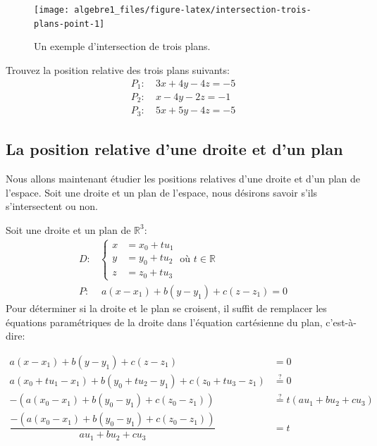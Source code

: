 \documentclass[]{book}
\theoremstyle{definition}
\theoremstyle{definition}
\theoremstyle{definition}
\theoremstyle{remark}
\let\BeginKnitrBlock\begin \let\EndKnitrBlock\end
\begin{document}
\begin{figure}

{\centering \texttt{[image: algebre1\_files/figure-latex/intersection-trois-plans-point-1]} 

}

\caption{Un exemple d'intersection de trois plans.}\label{fig:intersection-trois-plans-point}
\end{figure}

\BeginKnitrBlock{example}
\protect\hypertarget{exm:unnamed-chunk-228}{}{\label{exm:unnamed-chunk-228} }Trouvez la position relative des trois plans suivants:
\begin{align*}
P_1 :& \ 3x+4y-4z = -5 \\
P_2 :& \ x-4y-2z = -1 \\
P_3 :& \ 5x+5y-4z = -5
\end{align*}
\EndKnitrBlock{example}

\hypertarget{la-position-relative-dune-droite-et-dun-plan}{%
\subsection{La position relative d'une droite et d'un plan}\label{la-position-relative-dune-droite-et-dun-plan}}

Nous allons maintenant étudier les positions relatives d'une droite et d'un plan de l'espace. Soit une droite et un plan de l'espace, nous désirons savoir s'ils s'intersectent ou non.

Soit une droite et un plan de \(\mathbb{R}^3\):
\begin{align*}
D :& \begin{cases}
x &= x_0+tu_1 \\
y &= y_0+tu_2 \\
z &= z_0+tu_3
\end{cases} 
\ \text{où } t\in\mathbb{R} \\
P :& \ a(x-x_1)+b(y-y_1)+c(z-z_1)=0 
\end{align*}
Pour déterminer si la droite et le plan se croisent, il suffit de remplacer les équations paramétriques de la droite dans l'équation cartésienne du plan, c'est-à-dire:

\begin{align}
a(x-x_1)+b(y-y_1)+c(z-z_1) &= 0 \nonumber\\
a(x_0+tu_1-x_1)+b(y_0+tu_2-y_1)+c(z_0+tu_3-z_1) &\overset{?}{=} 0 \nonumber\\
-(a(x_0-x_1)+b(y_0-y_1)+c(z_0-z_1)) &\overset{?}{=} t(au_1+bu_2+cu_3) \nonumber\\
\dfrac{-(a(x_0-x_1)+b(y_0-y_1)+c(z_0-z_1))}{au_1+bu_2+cu_3} &= t \label{eq:positionplandroite}
\end{align}
\end{document}
